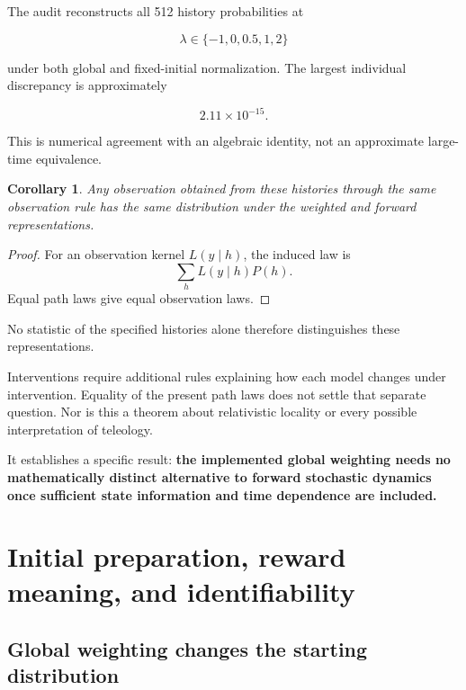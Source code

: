 \documentclass[11pt]{article}
\newtheorem{corollary}{Corollary}
\theoremstyle{remark}
\begin{document}
The audit reconstructs all 512 history probabilities at

\begin{equation}
\lambda\in\{-1,0,0.5,1,2\}
\end{equation}

under both global and fixed-initial normalization. The largest individual discrepancy is approximately

\begin{equation}
2.11\times10^{-15}.
\end{equation}

This is numerical agreement with an algebraic identity, not an approximate large-time equivalence.

\begin{corollary}
Any observation obtained from these histories through the same observation rule has the same distribution under the weighted and forward representations.
\end{corollary}

\begin{proof}
For an observation kernel \(L(y\mid h)\), the induced law is
\begin{equation}
\sum_h L(y\mid h)P(h).
\end{equation}
Equal path laws give equal observation laws.
\end{proof}

No statistic of the specified histories alone therefore distinguishes these representations.

Interventions require additional rules explaining how each model changes under intervention. Equality of the present path laws does not settle that separate question. Nor is this a theorem about relativistic locality or every possible interpretation of teleology.

It establishes a specific result: \textbf{the implemented global weighting needs no mathematically distinct alternative to forward stochastic dynamics once sufficient state information and time dependence are included.}

\section{Initial preparation, reward meaning, and identifiability}

\subsection{Global weighting changes the starting distribution}
\end{document}
